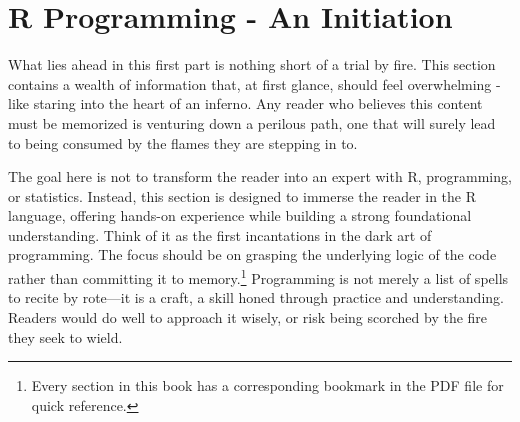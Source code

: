 \part{R Programming - An Initiation}

\IMFellEnglish

What lies ahead in this first part is nothing short of a trial by fire. This section contains a wealth of information that, at first glance, should feel overwhelming - like staring into the heart of an inferno. Any reader who believes this content must be memorized is venturing down a perilous path, one that will surely lead to being consumed by the flames they are stepping in to.

The goal here is not to transform the reader into an expert with R, programming, or statistics. Instead, this section is designed to immerse the reader in the R language, offering hands-on experience while building a strong foundational understanding. Think of it as the first incantations in the dark art of programming. The focus should be on grasping the underlying logic of the code rather than committing it to memory.\footnote{Every section in this book has a corresponding bookmark in the PDF file for quick reference.} Programming is not merely a list of spells to recite by rote—it is a craft, a skill honed through practice and understanding. Readers would do well to approach it wisely, or risk being scorched by the fire they seek to wield.
